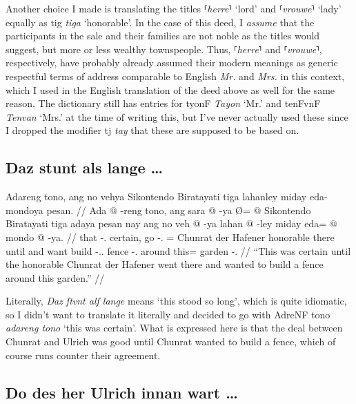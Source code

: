\documentclass[12pt,paper=a4]{scrartcl}
\newcommand{\fw}[1]{\textit{#1}} %
\newcommand{\norm}[1]{⸢\textit{#1}⸣} %
\newcommand{\ayr}[1]{{\Tagati #1}}
\newcommand{\xayr}[3]{{\Tagati #1} \emph{#2} \enquote*{#3}}
\begin{document}
Another choice I made is translating the titles \norm{herre} `lord' and 
\norm{vrouwe} `lady' equally as \xayr{tig}{tiga} {honorable}. In the case of 
this deed, I \emph{assume} that the participants in the sale and their families 
are not noble as the titles would suggest, but more or less wealthy townspeople. 
Thus, \norm{herre} and \norm{vrouwe}, respectively, have probably already 
assumed their modern meanings as generic respectful terms of address comparable 
to English \fw{Mr.} and \fw{Mrs.} in this context, which I used in the English 
translation of the deed above as well for the same reason. The dictionary still 
has entries for \xayr{tyonF}{Tayon}{Mr.} and \xayr{tenFvnF}{Tenvan}{Mrs.} 
at the time of writing this, but I've never actually used these since I dropped 
the modifier \ayr{tj} \fw{tay} that these are supposed to be based on.

\subsection*{Daz stunt als lange …}


\ex \begingl
	\glpreamble Adareng tono, ang no vehya Sikontendo Biratayati tiga
		lahanley miday eda-mondoya pesan. //
	\gla Ada @ -reng tono, ang sara @ -ya Ø= @ Sikontendo Biratayati tiga
		adaya pesan nay ang no veh @ -ya lahan @ -ley miday eda= @ mondo 
		@ -ya. //
	\glb that -\Aarg{}.\Inan{} certain, \AgtT{} go -\Tsg{}.\M{} \Top{}= 
		Chunrat {der Hafener} honorable there until and \AgtT{} want 
		build -\Tsg{}.\M{}.\Top{} fence -\Parg{}.\Inan{} around this= 
		garden -\Loc{}. //
	\glft \enquote{This was certain until the honorable Chunrat der Hafener 
		went there and wanted to build a fence around this garden.} //
\endgl \xe

Literally, \fw{Daz ſtvnt alſ lange} means `this stood so long', which is 
quite idiomatic, so I didn't want to translate it literally and decided to go 
with \xayr{AdreNF tono}{adareng tono}{this was certain}. What is expressed 
here is that the deal between Chunrat and Ulrich was good until Chunrat wanted 
to build a fence, which of course runs counter their agreement.

\subsection*{Do des her Ulrich innan wart …}
\end{document}
